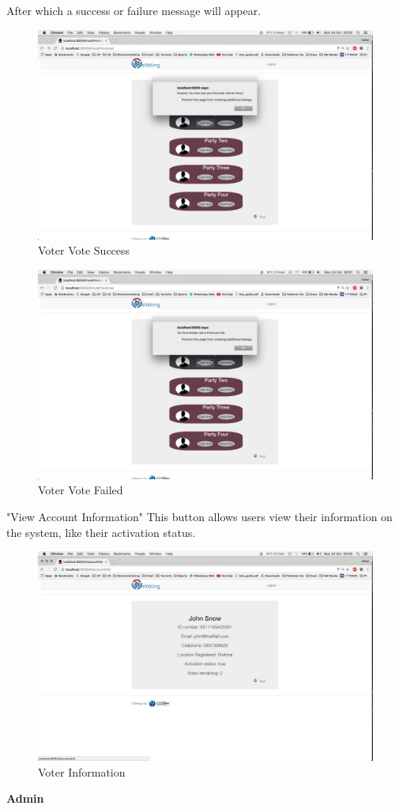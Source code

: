 \documentclass[11pt]{article}
\begin{document}
			After which a success or failure message will appear. 
				\begin{figure}[H]
					\centering
					\includegraphics[width=0.7\linewidth]{../Images/UserManual/voterWeb/votervotesuccess.png}
					\caption{Voter Vote Success}
				\end{figure}
			\begin{figure}[H]
				\centering
				\includegraphics[width=0.7\linewidth]{../Images/UserManual/voterWeb/voterfailedvote.png}
				\caption{Voter Vote Failed}
			\end{figure}
			
			"View Account Information"
			This button allows users view their information on the system, like their activation status. 
				\begin{figure}[H]
					\centering
					\includegraphics[width=0.7\linewidth]{../Images/UserManual/voterWeb/voterinfo.png}
					\caption{Voter Information}
				\end{figure}
				\newpage
				\textbf{Admin} \newline
				
\end{document}
